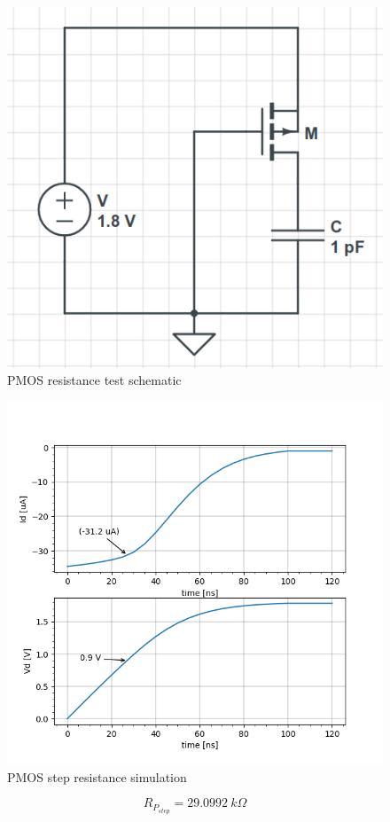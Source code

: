\newpage
\begin{figure}[!h]
	\centering
	\includegraphics[width=.3\linewidth]{../img/circ/P_rstep.png}
	\caption{PMOS resistance test schematic}
\end{figure}
%
\begin{figure}[!h]
	\centering
	\includegraphics[width=.7\linewidth]{../img/py/Prstep.png}
	\caption{PMOS step resistance simulation}
\end{figure}

$$ R_{P_{step}} = 29.0992 ~k \Omega$$


